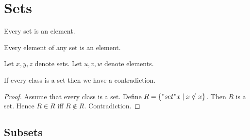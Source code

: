 \documentclass[../../sets-and-functions.ftl.tex]{subfiles}
\begin{document}

  \section{Sets}

  \begin{forthel}
    \begin{axiom}[SF 01 01  603161]
      Every set is an element.
    \end{axiom}

    \begin{axiom}[SF 01 01  617091]
      Every element of any set is an element.
    \end{axiom}

    Let $x,y,z$ denote sets.
    Let $u,v,w$ denote elements.

    \begin{theorem}[Russell]
      If every class is a set then we have a contradiction.
    \end{theorem}
    \begin{proof}
      Assume that every class is a set.
      Define $R = \{ "set" x \mid x \notin x \}$.
      Then $R$ is a set.
      Hence $R \in R$ iff $R \notin R$.
      Contradiction.
    \end{proof}
  \end{forthel}


  \subsection{Subsets}
\end{document}

